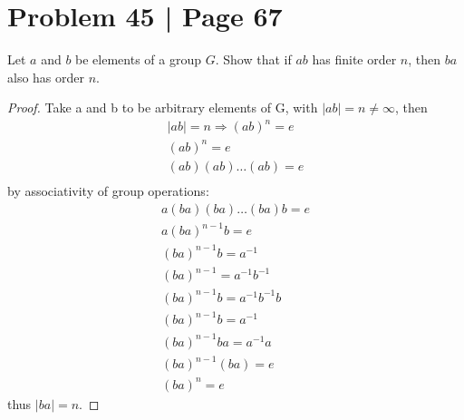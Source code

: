 \documentclass[12pt]{article}
\begin{document}
\section*{Problem 45 | Page 67}
Let \( a \) and \( b \) be elements of a group \( G \). 
Show that if \( ab \) has finite order \( n \), then \( ba \) also has order \( n \).
\begin{proof}
    Take a and b to be arbitrary elements of G, with \(|ab| = n \neq \infty\), then
    \begin{gather*}
        |ab| = n \Rightarrow (ab)^n = e \\ 
        (ab)^n = e \\ 
        (ab)(ab)\dots(ab) = e \\
    \end{gather*}
    by associativity of group operations: 
    \begin{gather*}
        a(ba)(ba)\dots(ba)b = e \\ 
        a(ba)^{n-1}b = e \\
        (ba)^{n-1}b = a^{-1} \\ 
        (ba)^{n-1} = a^{-1}b^{-1} \\ 
        (ba)^{n-1}b = a^{-1}b^{-1}b \\ 
        (ba)^{n-1}b = a^{-1} \\ 
        (ba)^{n-1}ba = a^{-1}a \\ 
        (ba)^{n-1}(ba) = e \\ 
        (ba)^n = e 
    \end{gather*}
    thus \(|ba| = n\).
    
    
\end{proof}
\end{document}
